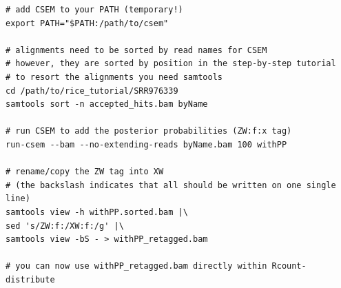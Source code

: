\documentclass[a4paper,10pt]{article}
\begin{document}
\begin{itemize}
\begin{verbatim}
# add CSEM to your PATH (temporary!)
export PATH="$PATH:/path/to/csem"

# alignments need to be sorted by read names for CSEM
# however, they are sorted by position in the step-by-step tutorial
# to resort the alignments you need samtools
cd /path/to/rice_tutorial/SRR976339
samtools sort -n accepted_hits.bam byName

# run CSEM to add the posterior probabilities (ZW:f:x tag)
run-csem --bam --no-extending-reads byName.bam 100 withPP

# rename/copy the ZW tag into XW
# (the backslash indicates that all should be written on one single line)
samtools view -h withPP.sorted.bam |\
sed 's/ZW:f:/XW:f:/g' |\
samtools view -bS - > withPP_retagged.bam

# you can now use withPP_retagged.bam directly within Rcount-distribute
\end{verbatim}
\end{itemize}
\clearpage
\end{document}
